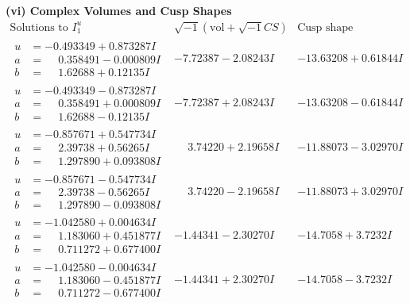 \documentclass[1p]{elsarticle_modified}
\theoremstyle{definition}
\newcommand{\I}{\sqrt{-1}}
\begin{document}
\newpage\flushleft \textbf{(vi) Complex Volumes and Cusp Shapes}
$$\begin{array}{c|c|c}  
\text{Solutions to }I^u_{1}& \I (\text{vol} + \sqrt{-1}CS) & \text{Cusp shape}\\
 \hline 
\begin{aligned}
u &= -0.493349 + 0.873287 I \\
a &= \phantom{-}0.358491 - 0.000809 I \\
b &= \phantom{-}1.62688 + 0.12135 I\end{aligned}
 & -7.72387 - 2.08243 I & -13.63208 + 0.61844 I \\ \hline\begin{aligned}
u &= -0.493349 - 0.873287 I \\
a &= \phantom{-}0.358491 + 0.000809 I \\
b &= \phantom{-}1.62688 - 0.12135 I\end{aligned}
 & -7.72387 + 2.08243 I & -13.63208 - 0.61844 I \\ \hline\begin{aligned}
u &= -0.857671 + 0.547734 I \\
a &= \phantom{-}2.39738 + 0.56265 I \\
b &= \phantom{-}1.297890 + 0.093808 I\end{aligned}
 & \phantom{-}3.74220 + 2.19658 I & -11.88073 - 3.02970 I \\ \hline\begin{aligned}
u &= -0.857671 - 0.547734 I \\
a &= \phantom{-}2.39738 - 0.56265 I \\
b &= \phantom{-}1.297890 - 0.093808 I\end{aligned}
 & \phantom{-}3.74220 - 2.19658 I & -11.88073 + 3.02970 I \\ \hline\begin{aligned}
u &= -1.042580 + 0.004634 I \\
a &= \phantom{-}1.183060 + 0.451877 I \\
b &= \phantom{-}0.711272 + 0.677400 I\end{aligned}
 & -1.44341 - 2.30270 I & -14.7058 + 3.7232 I \\ \hline\begin{aligned}
u &= -1.042580 - 0.004634 I \\
a &= \phantom{-}1.183060 - 0.451877 I \\
b &= \phantom{-}0.711272 - 0.677400 I\end{aligned}
 & -1.44341 + 2.30270 I & -14.7058 - 3.7232 I \\ \hline\begin{aligned}

\end{aligned}
\end{array}$$
\end{document}
